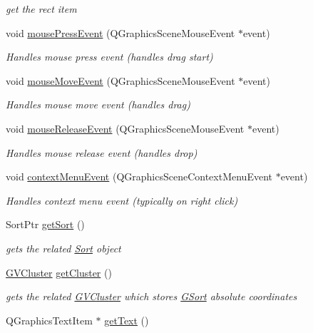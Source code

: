 \begin{DoxyCompactItemize}
\begin{DoxyCompactList}\small\item\em get the rect item \end{DoxyCompactList}\item 
void \hyperlink{class_g_sort_ac3cbef2a811660668cff937f56ca37fe}{mouse\-Press\-Event} (\-Q\-Graphics\-Scene\-Mouse\-Event $\ast$event)
\begin{DoxyCompactList}\small\item\em \-Handles mouse press event (handles drag start) \end{DoxyCompactList}\item 
void \hyperlink{class_g_sort_aad29bd2ba170cd9b89ca80edf3439367}{mouse\-Move\-Event} (\-Q\-Graphics\-Scene\-Mouse\-Event $\ast$event)
\begin{DoxyCompactList}\small\item\em \-Handles mouse move event (handles drag) \end{DoxyCompactList}\item 
void \hyperlink{class_g_sort_a340c92716c90ad010232fdd972902ff0}{mouse\-Release\-Event} (\-Q\-Graphics\-Scene\-Mouse\-Event $\ast$event)
\begin{DoxyCompactList}\small\item\em \-Handles mouse release event (handles drop) \end{DoxyCompactList}\item 
void \hyperlink{class_g_sort_ae7183314fea0d5a3d9a302004d0614a7}{context\-Menu\-Event} (\-Q\-Graphics\-Scene\-Context\-Menu\-Event $\ast$event)
\begin{DoxyCompactList}\small\item\em \-Handles context menu event (typically on right click) \end{DoxyCompactList}\item 
\-Sort\-Ptr \hyperlink{class_g_sort_a69520d78ab078c083b8090f9190424b0}{get\-Sort} ()
\begin{DoxyCompactList}\small\item\em gets the related \hyperlink{class_sort}{\-Sort} object \end{DoxyCompactList}\item 
\hyperlink{struct_g_v_cluster}{\-G\-V\-Cluster} \hyperlink{class_g_sort_ad843ded0ec50cef488015b82661991ed}{get\-Cluster} ()
\begin{DoxyCompactList}\small\item\em gets the related \hyperlink{struct_g_v_cluster}{\-G\-V\-Cluster} which stores \hyperlink{class_g_sort}{\-G\-Sort} absolute coordinates \end{DoxyCompactList}\item 
\hypertarget{class_g_sort_a4ea434778eaf6e7a6dc3603dc1076bb1}{\-Q\-Graphics\-Text\-Item $\ast$ \hyperlink{class_g_sort_a4ea434778eaf6e7a6dc3603dc1076bb1}{get\-Text} ()}\label{class_g_sort_a4ea434778eaf6e7a6dc3603dc1076bb1}


\end{DoxyCompactItemize}
